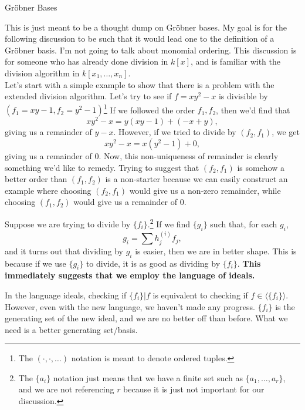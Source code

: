 \documentclass[11pt]{article}
\newcommand{\gb}{Gr\"{o}bner }
\newcommand*{\ideal}[1]{\langle#1\rangle}
\begin{document}
\begin{center}\sc\Large
\gb Bases
\end{center}

This is just meant to be a thought dump on \gb bases. My goal is for the following discussion to be such that it would lead one to the definition of a \gb basis. I'm not going to talk about monomial ordering. This discussion is for someone who has already done division in $k[x]$, and is familiar with the division algorithm in $k[x_1, \ldots, x_n]$. \\

Let's start with a simple example to show that there is a problem with the extended division algorithm. Let's try to see if $f = xy^2 - x$ is divisible by $(f_1 = xy - 1, f_2 = y^2 - 1)$\footnote{The $(\cdot, \cdot, \ldots)$ notation is meant to denote ordered tuples.} If we followed the order $f_1, f_2$, then we'd find that
\[
xy^2 - x = y(xy-1) + (-x + y),
\]
giving us a remainder of $y-x$. However, if we tried to divide by $(f_2, f_1)$, we get
\[
xy^2 - x = x(y^2-1) + 0,
\]
giving us a remainder of 0. Now, this non-uniqueness of remainder is clearly something we'd like to remedy. Trying to suggest that $(f_2, f_1)$ is somehow a better order than $(f_1, f_2)$ is a non-starter because we can easily construct an example where choosing $(f_2, f_1)$ would give us a non-zero remainder, while choosing $(f_1, f_2)$ would give us a remainder of 0. \\

\begin{ideabox}
Suppose we are trying to divide by $\{f_i\}$.\footnote{The $\{a_i\}$ notation just means that we have a finite set such as $\{a_1, \ldots, a_r\}$, and we are not referencing $r$ because it is just not important for our discussion.} If we find $\{g_i\}$  such that, for each $g_i$,
\[
g_i = \sum h^{(i)}_jf_j,
\]
and it turns out that dividing by $g_i$ is easier, then we are in better shape. This is because if we use $\{g_i\}$ to divide, it is as good as dividing by $\{f_i\}$. \textbf{This immediately suggests that we employ the language of ideals.}
\end{ideabox}

In the language ideals, checking if $\{f_i\} | f$ is equivalent to checking if $f \in \ideal{\{f_i\}}$. However, even with the new language, we haven't made any progress. $\{f_i\}$ is the generating set of the new ideal, and we are no better off than before. What we need is a better generating set/basis. \\
\end{document}

